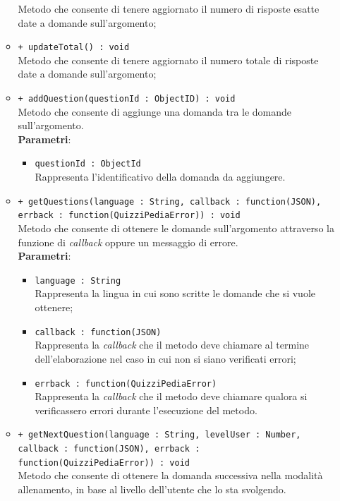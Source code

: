\begin{itemize}
\begin{itemize}
			Metodo che consente di tenere aggiornato il numero di risposte esatte date a domande sull'argomento;
			\item \texttt{+ updateTotal() : void} \\
			Metodo che consente di tenere aggiornato il numero totale di risposte date a domande sull'argomento;
			\item \texttt{+ addQuestion(questionId : ObjectID) : void} \\
			Metodo che consente di aggiunge una domanda tra le domande sull'argomento. \\
			\textbf{Parametri}:
			\begin{itemize}
			\item \texttt{questionId : ObjectId} \\
			Rappresenta l'identificativo della domanda da aggiungere.
			\end{itemize}
			\item \texttt{+ getQuestions(language : String, callback : function(JSON), errback : function(QuizziPediaError)) : void} \\
			Metodo che consente di ottenere le domande sull'argomento attraverso la funzione di \textit{callback} oppure un messaggio di errore. \\
			\textbf{Parametri}:
			\begin{itemize}
			\item \texttt{language : String} \\
			Rappresenta la lingua in cui sono scritte le domande che si vuole ottenere;
			\item \texttt{callback : function(JSON)} \\
			Rappresenta la \textit{callback} che il metodo deve chiamare al termine dell'elaborazione nel caso in cui non si siano verificati errori;
			\item \texttt{errback : function(QuizziPediaError)} \\
			Rappresenta la \textit{callback} che il metodo deve chiamare qualora si verificassero errori durante l'esecuzione del metodo.
			\end{itemize}
			\item \texttt{+ getNextQuestion(language : String, levelUser : Number, callback : function(JSON), errback : function(QuizziPediaError)) : void} \\
			Metodo che consente di ottenere la domanda successiva nella modalità allenamento, in base al livello dell'utente che lo sta svolgendo. \\

\end{itemize}
\end{itemize}

